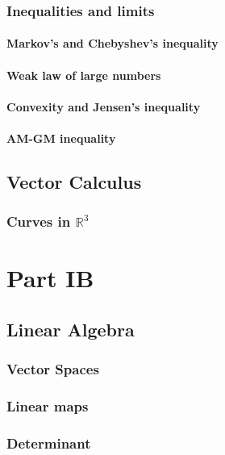 \documentclass[12pt]{book}
\newcommand{\RR}{\mathbb R}
\theoremstyle{definition}
\theoremstyle{remark}
\begin{document}
		\section{Inequalities and limits}
			\subsection{Markov's and Chebyshev's inequality}
			
			\subsection{Weak law of large numbers}
			
			\subsection{Convexity and Jensen's inequality}
			
			\subsection{AM-GM inequality}
	
	\chapter{Vector Calculus}
		\section{Curves in $\RR^3$}
		
	\part{Part IB}
	\chapter{Linear Algebra}
		\section{Vector Spaces}
		
		\section{Linear maps}
		
		\section{Determinant}
		
\end{document}
